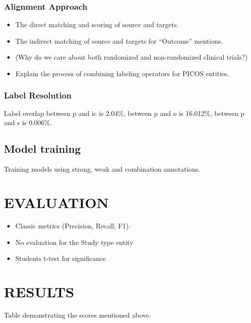 \documentclass[10.7pt,]{article}
\begin{document}
\subsubsection{Alignment Approach}
%
\begin{itemize}
    \item The direct matching and scoring of source and targets.
    \item The indirect matching of source and targets for ``Outcome'' mentions.
    \item (Why do we care about both randomized and non-randomized clinical trials?)
    \item Explain the process of combining labeling operators for PICOS entities.
\end{itemize}
%
\subsubsection{Label Resolution}
%
Label overlap between p and ic is 2.04\%, between p and o is 16.012\%, between p and s is 0.006\%.
%
%
%
\subsection{Model training}\label{modtrain}
Training models using strong, weak and combination annotations.
%
%
%
\section{EVALUATION}\label{eval}
%
\begin{itemize}
    \item Classic metrics (Precision, Recall, F1).
    \item No evaluation for the Study type entity
    \item Students t-test for significance
\end{itemize}
%
%
%
\section{RESULTS}\label{results}
%
Table demonstrating the scores mentioned above.
%
%
%
\end{document}
